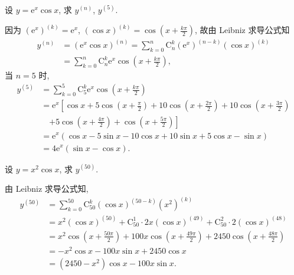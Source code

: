 \begin{example}\label{ex:3.2.4}
设 $y = \mathrm{e}^{x}\cos x$, 求 $y^{(n)}$, $y^{(5)}$.
\end{example}

\begin{solution}
因为 $(\mathrm{e}^{x})^{(k)} = \mathrm{e}^{x}$, $(\cos x)^{(k)} = \cos\left(x + \frac{k\pi}{2}\right)$, 故由 Leibniz 求导公式知
\[
\begin{aligned}
y^{(n)} &= \left(\mathrm{e}^{x}\cos x\right)^{(n)} = \sum_{k=0}^{n}\mathrm{C}_{n}^{k}\left(\mathrm{e}^{x}\right)^{(n-k)}\left(\cos x\right)^{(k)}\\
&= \sum_{k=0}^{n}\mathrm{C}_{n}^{k}\mathrm{e}^{x}\cos\left(x + \frac{k\pi}{2}\right),
\end{aligned}
\]
当 $n = 5$ 时,
\[
\begin{aligned}
y^{(5)} &= \sum_{k=0}^{5}\mathrm{C}_{5}^{k}\mathrm{e}^{x}\cos\left(x + \frac{k\pi}{2}\right)\\
&= \mathrm{e}^{x}\left[\cos x + 5\cos\left(x + \frac{\pi}{2}\right) + 10\cos\left(x + \frac{2\pi}{2}\right) + 10\cos\left(x + \frac{3\pi}{2}\right)\right.\\
&\quad \left. + 5\cos\left(x + \frac{4\pi}{2}\right) + \cos\left(x + \frac{5\pi}{2}\right)\right]\\
&= \mathrm{e}^{x}(\cos x - 5\sin x - 10\cos x + 10\sin x + 5\cos x - \sin x)\\
&= 4\mathrm{e}^{x}(\sin x - \cos x).
\end{aligned}
\]
\end{solution}

\begin{example}\label{ex:3.2.5}
设 $y = x^{2}\cos x$, 求 $y^{(50)}$.
\end{example}

\begin{solution}
由 Leibniz 求导公式知,
\[
\begin{aligned}
y^{(50)} &= \sum_{k=0}^{50}\mathrm{C}_{50}^{k}\left(\cos x\right)^{(50-k)}\left(x^{2}\right)^{(k)}\\
&= x^{2}\left(\cos x\right)^{(50)} + \mathrm{C}_{50}^{1}\cdot2x\left(\cos x\right)^{(49)} + \mathrm{C}_{50}^{2}\cdot2\left(\cos x\right)^{(48)}\\
&= x^{2}\cos\left(x + \frac{50\pi}{2}\right) + 100x\cos\left(x + \frac{49\pi}{2}\right) + 2450\cos\left(x + \frac{48\pi}{2}\right)\\
&= -x^{2}\cos x - 100x\sin x + 2450\cos x\\
&= (2450 - x^{2})\cos x - 100x\sin x.
\end{aligned}
\]
\end{solution}

